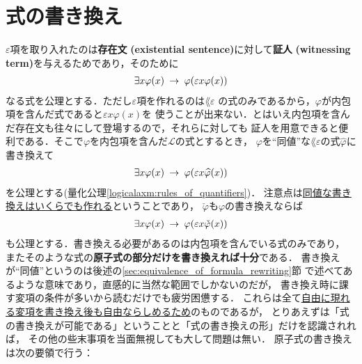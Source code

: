 \section{式の書き換え}
\label{subsec:formula_rewriting}
	$\varepsilon$項を取り入れたのは{\bf 存在文}
	{\bf (existential sentence)}に対して{\bf 証人}
	{\bf (witnessing term)}を与えるためであり，そのために
	\begin{align}
		\exists x \varphi(x) \hspace{0.25em}\rightarrow\hspace{0.25em} \varphi(\varepsilon x \varphi(x))
	\end{align}
	なる式を公理とする．ただし$\varepsilon$項を作れるのは$\lang{\varepsilon}$
	の式のみであるから，$\varphi$が内包項を含んだ式であると$\varepsilon x \varphi(x)$を
	使うことが出来ない．とはいえ内包項を含んだ存在文も往々にして登場するので，それらに対しても
	証人を用意できると便利である．そこで$\varphi$を内包項を含んだ$\mathcal{L}$の式とするとき，
	$\varphi$を``同値''な$\lang{\varepsilon}$の式$\widehat{\varphi}$に書き換えて
	\begin{align}
		\exists x \varphi(x) \hspace{0.25em}\rightarrow\hspace{0.25em} \varphi(\varepsilon x \widehat{\varphi}(x))
	\end{align}
	を公理とする(量化公理\ref{logicalaxm:rules_of_quantifiers})．
	注意点は\underline{同値な書き換えはいくらでも作れる}ということであり，
	$\check{\varphi}$も$\varphi$の書き換えならば
	\begin{align}
		\exists x \varphi(x) \hspace{0.25em}\rightarrow\hspace{0.25em} \varphi(\varepsilon x \check{\varphi}(x))
	\end{align}
	も公理とする．書き換える必要があるのは内包項を含んでいる式のみであり，
	またそのような式の{\bf 原子式の部分だけを書き換えれば十分}である．
	書き換えが``同値''というのは後述の\ref{sec:equivalence_of_formula_rewriting}節
	で述べてあるような意味であり，直感的に当然な範囲でしかないのだが，
	書き換え時に課す変項の条件が多いから読むだけでも疲労困憊する．
	これらは全て\underline{自由に現れる変項を書き換え後も自由ならしめるため}のものであるが，
	とりあえずは「式の書き換えが可能である」ということと「式の書き換えの形」だけを認識されれば，
	その他の些末事項を当面無視しても大して問題は無い．
	原子式の書き換えは次の要領で行う：
	
